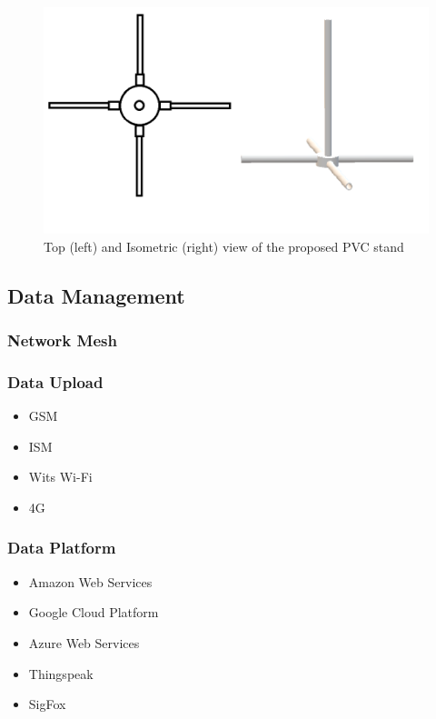 \documentclass[10pt,twocolumn]{witseiepaper}
\begin{document}
		\begin{figure}
			\centering
			\includegraphics[width=1\columnwidth]{media/topIsoStand.png}
			\caption{Top (left) and Isometric (right) view of the proposed PVC stand}
			\raggedright
			\label{fig:stand}
		\end{figure}
	
	\subsection{Data Management}
		\subsubsection{Network Mesh}
		\subsubsection{Data Upload}
			\begin{itemize}
				\item GSM
				\item ISM
				\item Wits Wi-Fi
				\item 4G
			\end{itemize}
		\subsubsection{Data Platform}
			\begin{itemize}
				\item Amazon Web Services
				\item Google Cloud Platform
				\item Azure Web Services
				\item Thingspeak
				\item SigFox
			\end{itemize}
	
\end{document}
